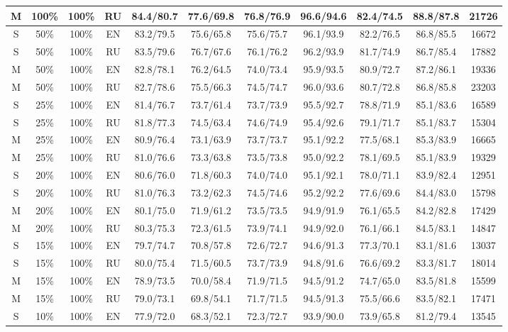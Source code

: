 \begin{table*}
{\begin{tabular}{|c|c|c|c||c|c|c|c|c|c||c|}
M & 100\% & 100\% & RU & 84.4/80.7 & 77.6/69.8 & 76.8/76.9 & 96.6/94.6 & 82.4/74.5 & 88.8/87.8 & 21726 \\ \hline
 S & 50\% & 100\% & EN & 83.2/79.5 & 75.6/65.8 & 75.6/75.7 & 96.1/93.9 & 82.2/76.5 & 86.8/85.5 & 16672 \\
 S & 50\% & 100\% & RU & 83.5/79.6 & 76.7/67.6 & 76.1/76.2 & 96.2/93.9 & 81.7/74.9 & 86.7/85.4 & 17882 \\
 M & 50\% & 100\% & EN & 82.8/78.1 & 76.2/64.5 & 74.0/73.4 & 95.9/93.5 & 80.9/72.7 & 87.2/86.1 & 19336 \\
M & 50\% & 100\% & RU & 82.7/78.6 & 75.5/66.3 & 74.5/74.7 & 96.0/93.6 & 80.7/72.8 & 86.8/85.8 & 23203 \\ \hline 
S & 25\% & 100\% & EN & 81.4/76.7 & 73.7/61.4 & 73.7/73.9 & 95.5/92.7 & 78.8/71.9 & 85.1/83.6 & 16589 \\
S & 25\% & 100\% & RU & 81.8/77.3 & 74.5/63.4 & 74.6/74.9 & 95.4/92.6 & 79.1/71.7 & 85.1/83.7 & 15304 \\
M & 25\% & 100\% & EN & 80.9/76.4 & 73.1/63.9 & 73.7/73.7 & 95.1/92.2 & 77.5/68.1 & 85.3/83.9 & 16665 \\
M & 25\% & 100\% & RU & 81.0/76.6 & 73.3/63.8 & 73.5/73.8 & 95.0/92.2 & 78.1/69.5 & 85.1/83.9 & 19329 \\ \hline 
S & 20\% & 100\% & EN & 80.6/76.0 & 71.8/60.3 & 74.0/74.0 & 95.1/92.1 & 78.0/71.1 & 83.9/82.4 & 12951 \\
S & 20\% & 100\% & RU & 81.0/76.3 & 73.2/62.3 & 74.5/74.6 & 95.2/92.2 & 77.6/69.6 & 84.4/83.0 & 15798 \\
 M & 20\% & 100\% & EN & 80.1/75.0 & 71.9/61.2 & 73.5/73.5 & 94.9/91.9 & 76.1/65.5 & 84.2/82.8 & 17429 \\
M & 20\% & 100\% & RU & 80.3/75.3 & 72.3/61.5 & 73.9/74.1 & 94.9/92.0 & 76.1/66.1 & 84.5/83.1 & 14847 \\ \hline
 S & 15\% & 100\% & EN & 79.7/74.7 & 70.8/57.8 & 72.6/72.7 & 94.6/91.3 & 77.3/70.1 & 83.1/81.6 & 13037 \\
S & 15\% & 100\% & RU & 80.0/75.4 & 71.5/60.5 & 73.7/73.9 & 94.8/91.6 & 76.6/69.2 & 83.3/81.7 & 18014 \\
 M & 15\% & 100\% & EN & 78.9/73.5 & 70.0/58.4 & 71.9/71.5 & 94.5/91.2 & 74.7/65.0 & 83.5/81.8 & 15599 \\
M & 15\% & 100\% & RU & 79.0/73.1 & 69.8/54.1 & 71.7/71.5 & 94.5/91.3 & 75.5/66.6 & 83.5/82.1 & 17471 \\ \hline
 S & 10\% & 100\% & EN & 77.9/72.0 & 68.3/52.1 & 72.3/72.7 & 93.9/90.0 & 73.9/65.8 & 81.2/79.4 & 13545 \\

\end{tabular}}
\end{table*}
